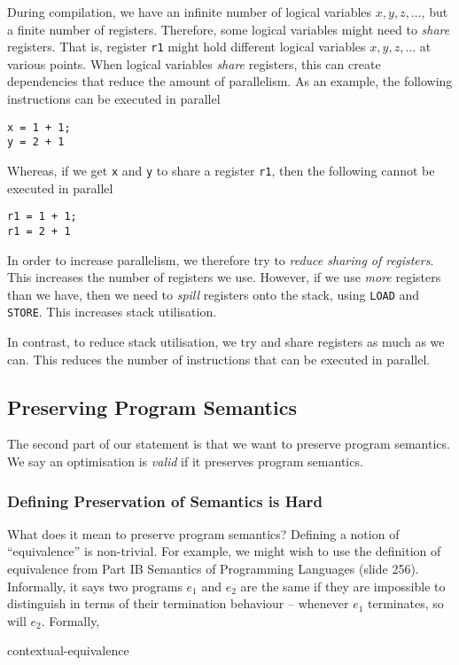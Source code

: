 During compilation, we have an infinite number of logical variables $x, y, z, \ldots$, but a finite number of registers. Therefore, some logical variables might need to \textit{share} registers. That is, register \texttt{r1} might hold different logical variables $x, y, z, \ldots$ at various points. When logical variables \textit{share} registers, this can create dependencies that reduce the amount of parallelism. As an example, the following instructions can be executed in parallel
\begin{verbatim}
x = 1 + 1;
y = 2 + 1
\end{verbatim}
Whereas, if we get \texttt{x} and \texttt{y} to share a register \texttt{r1}, then the following cannot be executed in parallel
\begin{verbatim}
r1 = 1 + 1;
r1 = 2 + 1
\end{verbatim}
In order to increase parallelism, we therefore try to \textit{reduce sharing of registers}. This increases the number of registers we use. However, if we use \textit{more} registers than we have, then we need to \textit{spill} registers onto the stack, using \texttt{LOAD} and \texttt{STORE}. This increases stack utilisation. 

In contrast, to reduce stack utilisation, we try and share registers as much as we can. This reduces the number of instructions that can be executed in parallel.


\subsection{Preserving Program Semantics}
The second part of our statement is that we want to preserve program semantics. We say an optimisation is \textit{valid} if it preserves program semantics. 

\subsubsection{Defining Preservation of Semantics is Hard}
What does it mean to preserve program semantics? Defining a notion of ``equivalence'' is non-trivial. For example, we might wish to use the definition of equivalence from \textsf{Part IB Semantics of Programming Languages} (slide 256). Informally, it says two programs $e_1$ and $e_2$ are the same if they are impossible to distinguish in terms of their termination behaviour -- whenever $e_1$ terminates, so will $e_2$. Formally, 

\begin{center}
    {contextual-equivalence}
\end{center}

